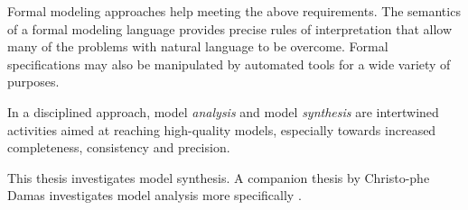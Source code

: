 Formal modeling approaches help meeting the above requirements. The semantics of a formal modeling language provides precise rules of interpretation that allow many of the problems with natural language to be overcome. Formal specifications may also be manipulated by automated tools for a wide variety of purposes. 

In a disciplined approach, model \emph{analysis} and model \emph{synthesis} are intertwined activities aimed at reaching high-quality models, especially towards increased completeness, consistency and precision.

This thesis investigates model synthesis. A companion thesis by Christo-phe Damas investigates model analysis more specifically \cite{Damas:2011}.
